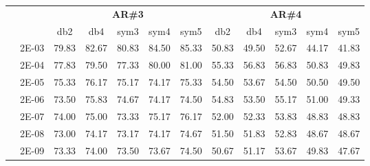\begin{table}[H]
\begin{tabular}{|c|c|c c c c c|c c c c c|}
\cline{3-12}
\multicolumn{2}{c}{} & \multicolumn{5}{|c|}{\textbf{AR\#3}}  & \multicolumn{5}{c|}{\textbf{AR\#4}} \\\cline{3-12}
\multicolumn{2}{c}{}  & \multicolumn{1}{|c}{db2} & db4 & sym3 & sym4 & sym5 & db2 & db4& sym3 & sym4 & sym5 \\\hline
\multicolumn{1}{|c|}{ \multirow{6}{*}{\rotatebox[origin=c]{90}{\textbf{Gamma}}} }
&2E-03&	79.83&	82.67&	80.83&	84.50&	85.33&	50.83&	49.50&	52.67&	44.17&	41.83	\\\cline{2-12}
&2E-04&	77.83&	79.50&	77.33&	80.00&	81.00&	55.33&	56.83&	56.83&	50.83&	49.83	\\\cline{2-12}
&2E-05&	75.33&	76.17&	75.17&	74.17&	75.33&	54.50&	53.67&	54.50&	50.50&	49.50	\\\cline{2-12}
&2E-06&	73.50&	75.83&	74.67&	74.17&	74.50&	54.83&	53.50&	55.17&	51.00&	49.33	\\\cline{2-12}
&2E-07&	74.00&	75.00&	73.33&	75.17&	76.17&	52.00&	52.33&	53.83&	48.83&	48.83	\\\cline{2-12}
&2E-08&	73.00&	74.17&	73.17&	74.17&	74.67&	51.50&	51.83&	52.83&	48.67&	48.67	\\\cline{2-12}
&2E-09&	73.33&	74.00&	73.50&	73.67&	74.50&	50.67&	51.17&	53.67&	49.83&	47.67	
	
	
	
\\\midrule
\end{tabular}

\end{table}



